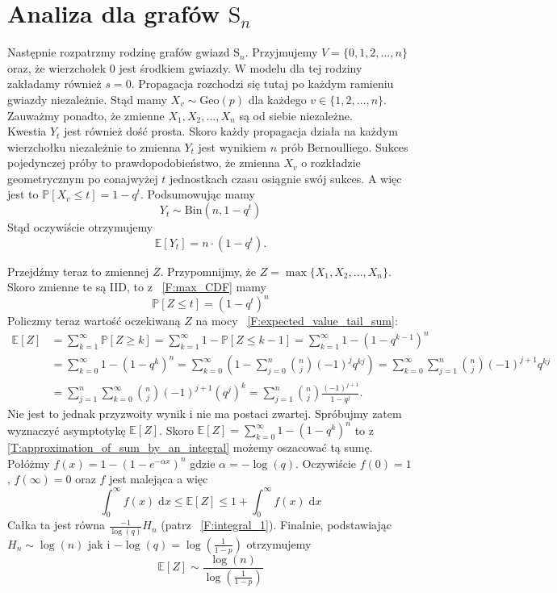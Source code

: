 \section{Analiza dla grafów $\mathrm{S}_n$}

Następnie rozpatrzmy rodzinę grafów gwiazd $\mathrm{S}_n$. Przyjmujemy $V=\{0,1,2,\dots,n\}$ oraz, że wierzchołek $0$ jest środkiem gwiazdy. W modelu dla tej rodziny zakładamy również $s=0$. Propagacja rozchodzi się tutaj po każdym ramieniu gwiazdy niezależnie. 
Stąd mamy $X_v \sim \mathrm{Geo}(p)$ dla każdego $v\in\{1,2,\dots,n\}$. Zauważmy ponadto, że zmienne $X_1,X_2,\dots,X_n$ są od siebie niezależne.\\

Kwestia $Y_t$ jest również dość prosta. Skoro każdy propagacja działa na każdym wierzchołku niezależnie to zmienna $Y_t$ jest wynikiem $n$ prób Bernoulliego. Sukces pojedynczej próby to prawdopodobieństwo, że zmienna $X_v$ o rozkładzie geometrycznym po conajwyżej $t$ jednostkach czasu osiągnie swój sukces. A więc jest to $\mathbb{P}[X_v\le t]=1-q^t$. Podsumowując mamy
\[
    Y_t \sim \mathrm{Bin}(n, 1-q^t)
\]
Stąd oczywiście otrzymujemy 
\[
    \mathbb{E}[Y_t] = n\cdot (1-q^t). 
\]

Przejdźmy teraz to zmiennej $Z$. Przypomnijmy, że $Z=\max\{X_1,X_2,\dots,X_n\}$. Skoro zmienne te są IID, to z ~\ref{F:max_CDF} mamy 
\[
    \mathbb{P}[Z\le t] = (1-q^t)^n
\]
Policzmy teraz wartość oczekiwaną $Z$ na mocy ~\ref{F:expected_value_tail_sum}:
\begin{align*}
\mathbb{E}[Z] 
&= \sum_{k=1}^{\infty} \mathbb{P}[Z\ge k] 
 = \sum_{k=1}^{\infty} 1 - \mathbb{P}[Z\le k-1]
 = \sum_{k=1}^{\infty}  1 - (1-q^{k-1})^n  \\
&= \sum_{k=0}^{\infty}  1 - (1-q^k)^n 
 = \sum_{k=0}^{\infty} \left( 1 - \sum_{j=0}^{n} \binom{n}{j} (-1)^j q^{kj} \right) 
 = \sum_{k=0}^{\infty} \sum_{j=1}^{n} \binom{n}{j} (-1)^{j+1} q^{kj} \\
&= \sum_{j=1}^{n} \sum_{k=0}^{\infty} \binom{n}{j} (-1)^{j+1} (q^j)^k 
 = \sum_{j=1}^{n} \binom{n}{j} \frac{(-1)^{j+1}}{1-q^j}.
\end{align*}
Nie jest to jednak przyzwoity wynik i nie ma postaci zwartej. Spróbujmy zatem wyznaczyć asymptotykę $\mathbb{E}[Z]$. Skoro $\mathbb{E}[Z] = \sum_{k=0}^{\infty}  1 - (1-q^k)^n$ to z \ref{T:approximation_of_sum_by_an_integral} możemy oszacować tą sumę. Połóżmy $f(x) = 1 - (1 - e^{-\alpha x})^n$ gdzie $\alpha = -\log(q)$. Oczywiście $f(0)=1$ , $f(\infty)=0$ oraz $f$ jest malejąca a więc
\[
    \int_{0}^{\infty} f(x) \; \mathrm{d}x \le \mathbb{E}[Z] \le  1 + \int_{0}^{\infty} f(x) \; \mathrm{d}x
\]
Całka ta jest równa $\frac{-1}{\log(q)} H_n$ (patrz ~\ref{F:integral_1}). Finalnie, podstawiając $H_n \sim \log(n)$ jak i $-\log(q)=\log(\frac{1}{1-p})$ otrzymujemy
\[
    \mathbb{E}[Z] \sim \frac{\log(n)}{\log(\frac{1}{1-p})}
\]


